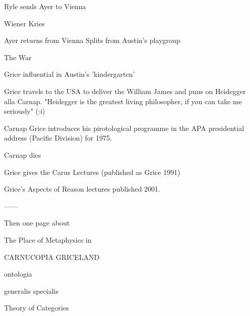 \documentclass[10pt,titlepage]{book}
\begin{document}
{                                           Ryle sends Ayer to 
                                               Vienna
 
 Wiener Kries
 
 
                                     Ayer returns from Vienna
                              Splits from Austin's playgroup
 
                     The War
 
                                     Grice influential
                                      in Austin's 'kindergarten'
 
                          
                                      Grice  travels to the USA
                                       to deliver the William James
                                       and puns on Heidegger alla
                                       Carnap.
                                    "Heidegger is the greatest living
                                     philosopher, if you can take
                                     me seriously" (\cite{grice89}:i)
 
 
   Carnap       
                                     Grice introduces his pirotological
                                      programme in the APA presidential
                                      address (Pacific Division) for 1975.
 
 
      Carnap dies
 
                                     Grice gives the Carus Lectures
                                           (published as Grice 1991)
 
                                    Grice's Aspects of Reason lectures
                                            published 2001.
 
 
 
------
 
 
Then one page about 
 
                The Place of Metaphysics in
 
 
CARNUCOPIA                                   GRICELAND
 
 
                                                       ontologia
 
 
                                       generalis                           
specialis
 
                                    Theory of Categories
 
}
\end{document}
